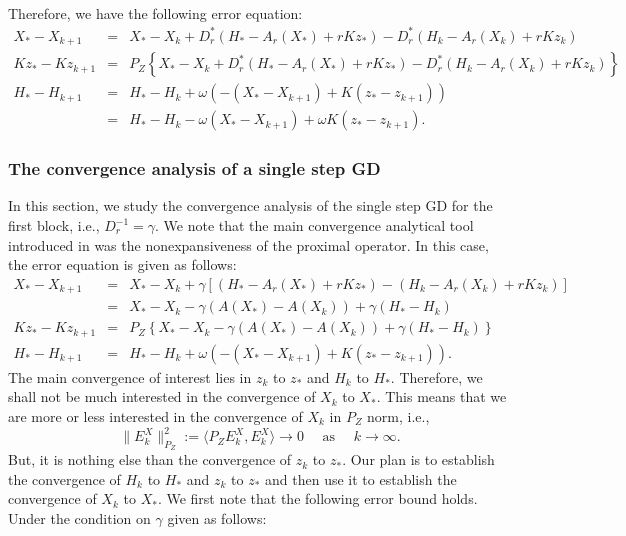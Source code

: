 \begin{itemize}
\begin{eqnarray*}
\end{eqnarray*}
Therefore, we have the following error equation: 
\begin{eqnarray*}
X_{*} - X_{k+1} &=& X_* - X_k + D_r^{*} (H_* - A_r(X_*) + r K z_*) - D_r^{*} (H_k - A_r(X_k) + r K z_k) \\
Kz_{*} - Kz_{k+1} &=& P_Z \left \{ X_* - X_k + D_r^{*} (H_* - A_r(X_*) + rK z_*) - D_r^{*} (H_k - A_r(X_k) + rK z_k) \right \} \\
H_{*} - H_{k+1} &=& H_* - H_k + \omega (-(X_{*} - X_{k+1}) + K(z_{*} - z_{k+1})) \\ 
&=& H_* - H_k - \omega (X_{*} - X_{k+1}) + \omega K( z_{*} - z_{k+1}). 
\end{eqnarray*}

\subsubsection{The convergence analysis of a single step GD} In this section, we study the convergence analysis of the single step GD for the first block, i.e., $D_r^{-1} = \gamma$. We note that the main convergence analytical tool introduced in \cite{mishchenko2022proxskip} was the nonexpansiveness of the proximal operator. In this case, the error equation is given as follows: 
\begin{eqnarray*}
X_{*} - X_{k+1} &=& X_* - X_k + \gamma \left [(H_* - A_r(X_*) + r K z_*) - (H_k - A_r(X_k) + r K z_k) \right ] \\
&=& X_* - X_k - \gamma (A(X_*) - A(X_k)) + \gamma (H_* - H_k) \\ 
Kz_{*} - Kz_{k+1} &=& P_Z \left \{X_* - X_k - \gamma (A(X_*) - A(X_k)) + \gamma (H_* - H_k) \right \} \\
H_{*} - H_{k+1} &=& H_* - H_k + \omega (-(X_{*} - X_{k+1}) + K ( z_{*} - z_{k+1})). 
\end{eqnarray*}
The main convergence of interest lies in $z_k$ to $z_*$ and $H_k$ to $H_*$. Therefore, we shall not be much interested in the convergence of $X_k$ to $X_*$. This means that we are more or less interested in the convergence of $X_k$ in $P_Z$ norm, i.e., 
\begin{equation*}
\|E_k^X\|_{P_Z}^2 := \langle P_Z E_k^X, E_k^X \rangle \rightarrow 0 \quad \mbox{ as } \quad k \rightarrow \infty.
\end{equation*}
But, it is nothing else than the convergence of $z_k$ to $z_*$. Our plan is to establish the convergence of $H_k$ to $H_*$ and $z_k$ to $z_*$ and then use it to establish the convergence of $X_k$ to $X_*$. We first note that the following error bound holds. Under the condition on $\gamma$ given as follows: 

\end{itemize}
